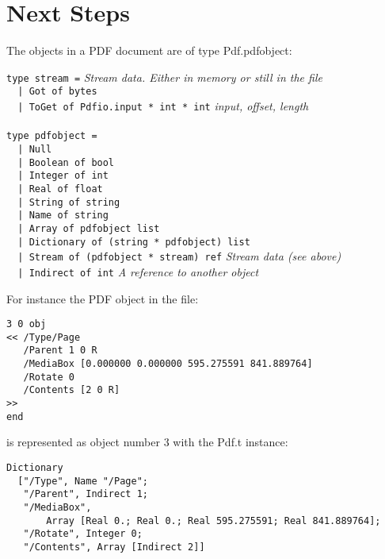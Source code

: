 \documentclass[a4paper]{memoir}
\begin{document}
\section*{Next Steps}
The objects in a PDF document are of type \textsf{Pdf.pdfobject}:
\begin{framed}
\noindent\verb!type stream =! \textit{Stream data. Either in memory or still in the file}\\
\verb!  | Got of bytes!\\
\verb!  | ToGet of Pdfio.input * int * int! \textit{input, offset, length}\\
\verb!!\\
\verb!type pdfobject =!\\
\verb!  | Null!\\
\verb!  | Boolean of bool!\\
\verb!  | Integer of int!\\
\verb!  | Real of float!\\
\verb!  | String of string!\\
\verb!  | Name of string!\\
\verb!  | Array of pdfobject list!\\
\verb!  | Dictionary of (string * pdfobject) list!\\
\verb!  | Stream of (pdfobject * stream) ref! \textit{Stream data (see above)}\\
\verb!  | Indirect of int! \textit{A reference to another object}\\
\end{framed}

\noindent For instance the PDF object in the file:

\begin{framed}
\begin{verbatim}
3 0 obj
<< /Type/Page
   /Parent 1 0 R
   /MediaBox [0.000000 0.000000 595.275591 841.889764]
   /Rotate 0
   /Contents [2 0 R]
>>
end
\end{verbatim}
\end{framed}

\noindent is represented as object number 3 with the Pdf.t instance:
\begin{framed}
\small\begin{verbatim}
Dictionary
  ["/Type", Name "/Page";
   "/Parent", Indirect 1;
   "/MediaBox",
       Array [Real 0.; Real 0.; Real 595.275591; Real 841.889764];
   "/Rotate", Integer 0;
   "/Contents", Array [Indirect 2]]
\end{verbatim}
\end{framed}
\end{document}
